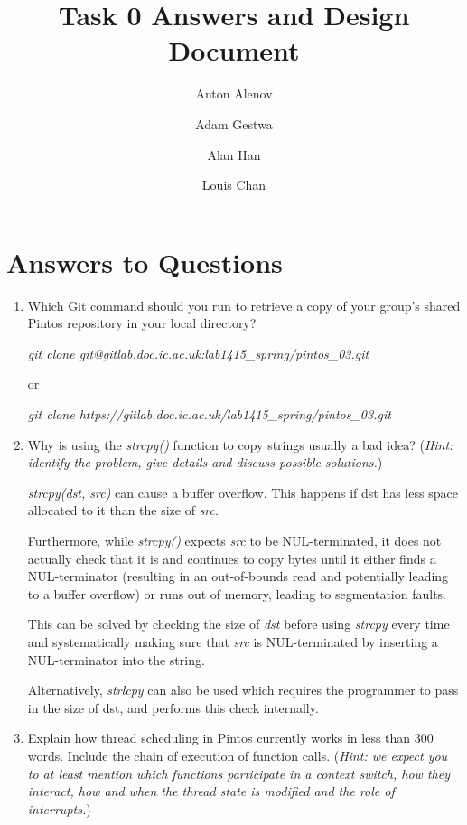\documentclass[11pt]{article}
\begin{document}
\title{Task 0 Answers and Design Document}
\author{Anton Alenov \and Adam Gestwa \and Alan Han \and Louis Chan}

\maketitle

\section{Answers to Questions}

\begin{enumerate}

\item Which Git command should you run to retrieve a copy of your group's shared
Pintos repository in your local directory?

\emph{git clone git@gitlab.doc.ic.ac.uk:lab1415\_spring/pintos\_03.git}

or

\emph{git clone https://gitlab.doc.ic.ac.uk/lab1415\_spring/pintos\_03.git}

\item Why is using the \emph{strcpy()} function to copy strings usually a bad
idea?
(\emph{Hint: identify the problem, give details and discuss possible
solutions.})

\emph{strcpy(dst, src)} can cause a buffer overflow. This happens if dst has
less space allocated to it than the size of \emph{src}.

Furthermore, while \emph{strcpy()} expects \emph{src} to be NUL-terminated, it
does not actually check that it is and continues to copy bytes until it either
finds a NUL-terminator (resulting in an out-of-bounds read and potentially
leading to a buffer overflow) or runs out of memory, leading to segmentation
faults.

This can be solved by checking the size of \emph{dst} before using \emph{strcpy}
every time and systematically making sure that \emph{src} is NUL-terminated by
inserting a NUL-terminator into the string.

Alternatively, \emph{strlcpy} can also be used which requires the programmer to
pass in the size of dst, and performs this check internally.

\item Explain how thread scheduling in Pintos currently works in less than 300
words. Include the chain of execution of function calls.
(\emph{Hint: we expect you to at least mention which functions participate in a
context switch, how they interact, how and when the thread state is modified and
the role of interrupts.})


\end{enumerate}
\end{document}
